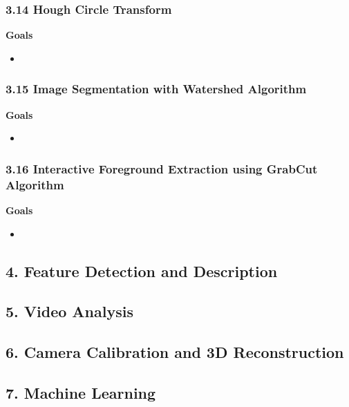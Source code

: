 \documentclass[11pt]{article}
\begin{document}
    \subsubsection{3.14 Hough Circle
Transform}\label{hough-circle-transform}

\textbf{Goals}

\begin{itemize}
\item
\end{itemize}

    \subsubsection{3.15 Image Segmentation with Watershed
Algorithm}\label{image-segmentation-with-watershed-algorithm}

\textbf{Goals}

\begin{itemize}
\item
\end{itemize}

    \subsubsection{3.16 Interactive Foreground Extraction using GrabCut
Algorithm}\label{interactive-foreground-extraction-using-grabcut-algorithm}

\textbf{Goals}

\begin{itemize}
\item
\end{itemize}

    \subsection{4. Feature Detection and
Description}\label{feature-detection-and-description}

    \subsection{5. Video Analysis}\label{video-analysis}

    \subsection{6. Camera Calibration and 3D
Reconstruction}\label{camera-calibration-and-3d-reconstruction}

    \subsection{7. Machine Learning}\label{machine-learning}
\end{document}
